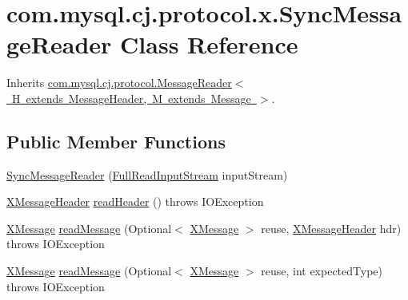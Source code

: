 \hypertarget{classcom_1_1mysql_1_1cj_1_1protocol_1_1x_1_1_sync_message_reader}{}\section{com.\+mysql.\+cj.\+protocol.\+x.\+Sync\+Message\+Reader Class Reference}
\label{classcom_1_1mysql_1_1cj_1_1protocol_1_1x_1_1_sync_message_reader}


Inherits \mbox{\hyperlink{interfacecom_1_1mysql_1_1cj_1_1protocol_1_1_message_reader}{com.\+mysql.\+cj.\+protocol.\+Message\+Reader$<$ H extends Message\+Header, M extends Message $>$}}.

\subsection*{Public Member Functions}
\begin{DoxyCompactItemize}
\item 
\mbox{\hyperlink{classcom_1_1mysql_1_1cj_1_1protocol_1_1x_1_1_sync_message_reader_a2464524fa481333d1d350b03f41d14ad}{Sync\+Message\+Reader}} (\mbox{\hyperlink{classcom_1_1mysql_1_1cj_1_1protocol_1_1_full_read_input_stream}{Full\+Read\+Input\+Stream}} input\+Stream)
\item 
\mbox{\hyperlink{classcom_1_1mysql_1_1cj_1_1protocol_1_1x_1_1_x_message_header}{X\+Message\+Header}} \mbox{\hyperlink{classcom_1_1mysql_1_1cj_1_1protocol_1_1x_1_1_sync_message_reader_a057a4fcddafa78836d874a30205936fc}{read\+Header}} ()  throws I\+O\+Exception 
\item 
\mbox{\hyperlink{classcom_1_1mysql_1_1cj_1_1protocol_1_1x_1_1_x_message}{X\+Message}} \mbox{\hyperlink{classcom_1_1mysql_1_1cj_1_1protocol_1_1x_1_1_sync_message_reader_a80429605aa58590c81c645fabf200f1e}{read\+Message}} (Optional$<$ \mbox{\hyperlink{classcom_1_1mysql_1_1cj_1_1protocol_1_1x_1_1_x_message}{X\+Message}} $>$ reuse, \mbox{\hyperlink{classcom_1_1mysql_1_1cj_1_1protocol_1_1x_1_1_x_message_header}{X\+Message\+Header}} hdr)  throws I\+O\+Exception 
\item 
\mbox{\hyperlink{classcom_1_1mysql_1_1cj_1_1protocol_1_1x_1_1_x_message}{X\+Message}} \mbox{\hyperlink{classcom_1_1mysql_1_1cj_1_1protocol_1_1x_1_1_sync_message_reader_a878c3dcae955da43eb45bee60d904e54}{read\+Message}} (Optional$<$ \mbox{\hyperlink{classcom_1_1mysql_1_1cj_1_1protocol_1_1x_1_1_x_message}{X\+Message}} $>$ reuse, int expected\+Type)  throws I\+O\+Exception 
\end{DoxyCompactItemize}


